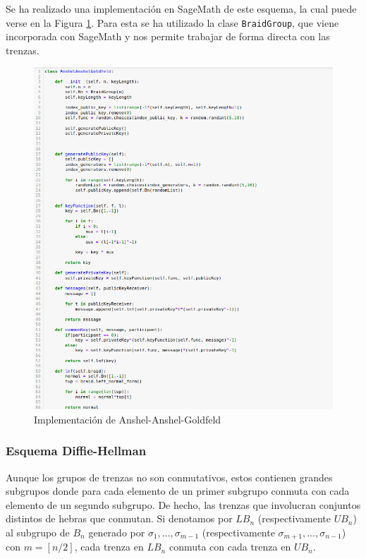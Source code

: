 \documentclass[12pt]{book}
\theoremstyle{definition}
\begin{document}
Se ha realizado una implementación en SageMath de este esquema, la cual puede verse en la Figura \ref{img:imp_anshel}. Para esta se ha utilizado la clase \texttt{BraidGroup}, que viene incorporada con SageMath y nos permite trabajar de forma directa con las trenzas.

\begin{figure}
\includegraphics[scale=0.5]{imgs/Anshel.png}
\caption{Implementación de Anshel-Anshel-Goldfeld}
\label{img:imp_anshel}
\end{figure}



\subsubsection*{Esquema Diffie-Hellman} Aunque los grupos de trenzas no son conmutativos, estos contienen grandes subgrupos donde para cada elemento de un primer subgrupo conmuta con cada elemento de un segundo subgrupo. De hecho, las trenzas que involucran conjuntos distintos de hebras que conmutan. Si denotamos por $LB_n$ (respectivamente $UB_n$) al subgrupo de $B_n$ generado por $\sigma_1,...,\sigma_{m-1}$ (respectivamente $\sigma_{m+1},...,\sigma_{n-1}$) con $m=[n/2]$, cada trenza en $LB_n$ conmuta con cada trenza en $UB_n$.
\end{document}
